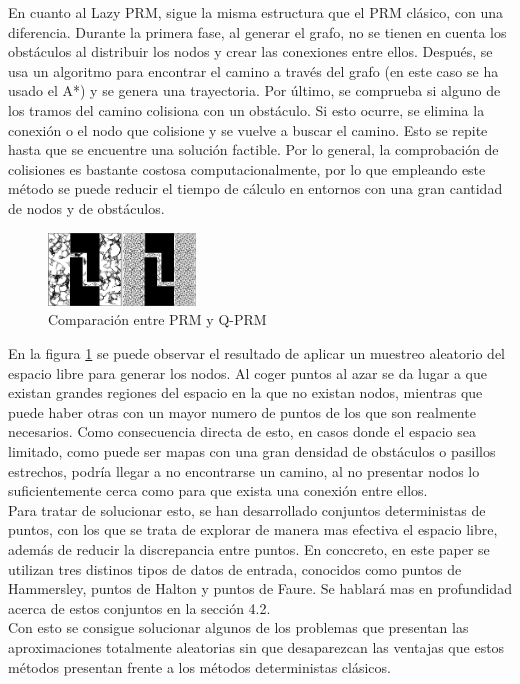 En cuanto al Lazy PRM, sigue la misma estructura que el PRM clásico, con una diferencia. Durante la primera fase, al generar el grafo, no se tienen en cuenta los obstáculos al distribuir los nodos y crear las conexiones entre ellos. Después, se usa un algoritmo para encontrar el camino a través del grafo (en este caso se ha usado el A*) y se genera una trayectoria. Por último, se comprueba si alguno de los tramos del camino colisiona con un obstáculo. Si esto ocurre, se elimina la conexión o el nodo que colisione y se vuelve a buscar el camino. Esto se repite hasta que se encuentre una solución factible. Por lo general, la comprobación de colisiones es bastante costosa computacionalmente, por lo que empleando este método se puede reducir el tiempo de cálculo en entornos con una gran cantidad de nodos y de obstáculos.  
\\

\begin{figure}[h]
		\centering
        \includegraphics[width=0.35\textwidth]{images/PRM_y_Q-PRM.png}
        \caption{Comparación entre PRM y Q-PRM}
        \label{fig:comparacion_algoritmos}
\end{figure} 

En la figura \ref{fig:comparacion_algoritmos} se puede observar el resultado de aplicar un muestreo aleatorio del espacio libre para generar los nodos. Al coger puntos al azar se da lugar a que existan grandes regiones del espacio en la que no existan nodos, mientras que puede haber otras con un mayor numero de puntos de los que son realmente necesarios. Como consecuencia directa de esto, en casos donde el espacio sea limitado, como puede ser mapas con una gran densidad de obstáculos o pasillos estrechos, podría llegar a no encontrarse un camino, al no presentar nodos lo suficientemente cerca como para que exista una conexión entre ellos.
\\

Para tratar de solucionar esto, se han desarrollado conjuntos deterministas de puntos, con los que se trata de explorar de manera mas efectiva el espacio libre, además de reducir la discrepancia entre puntos. En conccreto, en este paper se utilizan tres distinos tipos de datos de entrada, conocidos como puntos de Hammersley, puntos de Halton y puntos de Faure. Se hablará mas en profundidad acerca de estos conjuntos en la sección 4.2.
\\

Con esto se consigue solucionar algunos de los problemas que presentan las aproximaciones totalmente aleatorias sin que desaparezcan las ventajas que estos métodos presentan frente a los métodos deterministas clásicos.
\\
\\